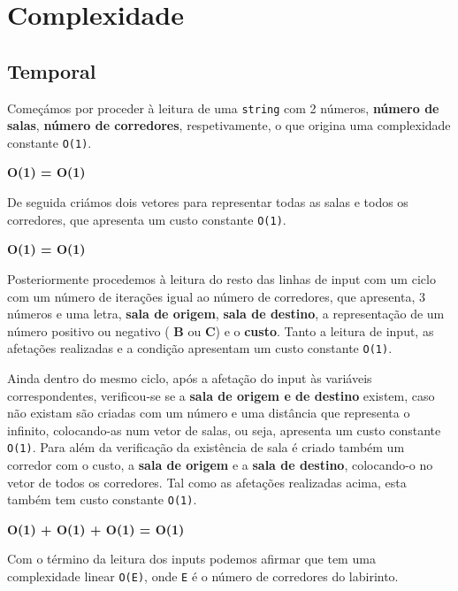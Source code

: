 \documentclass[11pt]{article}
\begin{document}
\section{Complexidade}
\subsection{Temporal}

\hspace{0,5cm}Começámos por proceder à leitura de uma \verb|string| com 2 números, \textbf{número
de salas}, \textbf{número de corredores}, respetivamente, o que origina uma complexidade constante
\verb|O(1)|.

\begin{center}
    \textbf{O(1) = O(1)}
\end{center}

De seguida criámos dois vetores para representar todas as salas e todos os corredores, que apresenta
um custo constante \verb|O(1)|.

\begin{center}
    \textbf{O(1) = O(1)}
\end{center}

Posteriormente procedemos à leitura do resto das linhas de input com um ciclo com um número
de iterações igual ao número de corredores, que apresenta, 3 números e uma letra, \textbf{sala
de origem}, \textbf{sala de destino}, a representação de um número positivo ou negativo (
\textbf{B} ou \textbf{C}) e o \textbf{custo}. Tanto a leitura de input, as afetações realizadas
e a condição apresentam um custo constante \verb|O(1)|.

Ainda dentro do mesmo ciclo, após a afetação do input às variáveis correspondentes, verificou-se
se a \textbf{sala de origem e de destino} existem, caso não existam são criadas com um número e
uma distância que representa o infinito, colocando-as num vetor de salas, ou seja, apresenta um
custo constante \verb|O(1)|. Para além da verificação da existência de sala é criado também um
corredor com o custo, a \textbf{sala de origem} e a \textbf{sala de destino}, colocando-o no 
vetor de todos os corredores. Tal como as afetações realizadas acima, esta também tem custo
constante \verb|O(1)|.

\begin{center}
    \textbf{O(1) + O(1) + O(1) = O(1)}
\end{center}

Com o término da leitura dos inputs podemos afirmar que tem uma complexidade linear \verb|O(E)|,
onde \verb|E| é o número de corredores do labirinto.
\end{document}

